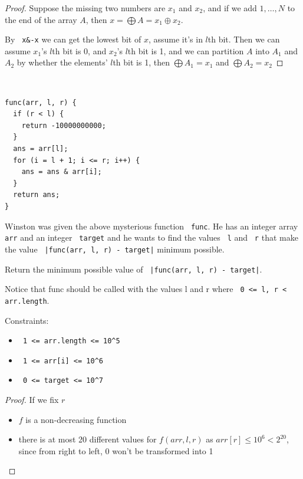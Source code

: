 \documentclass[11pt]{article}
\let\OldTexttt\texttt
\renewcommand{\texttt}[1]{\OldTexttt{\color{MidnightBlue} #1}}
\begin{document}
\begin{proof}
Suppose the missing two numbers are \(x_1\) and \(x_2\), and if we add \(1,\dots,N\) to the end of the
array \(A\), then \(x=\bigoplus A=x_1\oplus x_2\).

By \texttt{x\&-x} we can get the lowest bit of \(x\), assume it's in \(l\)th bit. Then we can
assume \(x_1\)'s \(l\)th bit is 0, and \(x_2\)'s \(l\)th bit is 1, and we can partition \(A\) into
\(A_1\) and \(A_2\) by whether the elements' \(l\)th bit is 1, then \(\bigoplus A_1=x_1\) and \(\bigoplus A_2=x_2\)
\end{proof}

\begin{problem}
​
\begin{verbatim}
func(arr, l, r) {
  if (r < l) {
    return -10000000000;
  }
  ans = arr[l];
  for (i = l + 1; i <= r; i++) {
    ans = ans & arr[i];
  }
  return ans;
}
\end{verbatim}
Winston was given the above mysterious function \texttt{func}. He has an integer array \texttt{arr} and an integer
\texttt{target} and he wants to find the values \texttt{l} and \texttt{r} that make the value \texttt{|func(arr, l, r) - target|}
minimum possible.

Return the minimum possible value of \texttt{|func(arr, l, r) - target|}.

Notice that func should be called with the values l and r where \texttt{0 <= l, r < arr.length}.

Constraints:
\begin{itemize}
\item \texttt{1 <= arr.length <= 10\textasciicircum{}5}
\item \texttt{1 <= arr[i] <= 10\textasciicircum{}6}
\item \texttt{0 <= target <= 10\textasciicircum{}7}
\end{itemize}
\end{problem}

\begin{proof}
If we fix \(r\)
\begin{itemize}
\item \(f\) is a non-decreasing function
\item there is at most 20 different values for \(f(arr,l,r)\) as \(arr[r]\le 10^6<2^{20}\), since from
right to left, 0 won't be transformed into 1
\end{itemize}
\end{proof}
\end{document}
